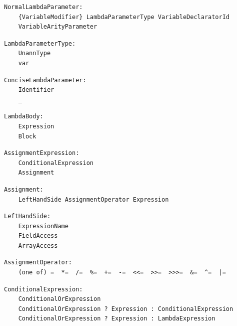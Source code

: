 \noindent\textbf{\texttt{}}\par
\begin{lstlisting}
NormalLambdaParameter:
    {VariableModifier} LambdaParameterType VariableDeclaratorId
    VariableArityParameter
\end{lstlisting}

\noindent\textbf{\texttt{}}\par
\begin{lstlisting}
LambdaParameterType:
    UnannType
    var
\end{lstlisting}

\noindent\textbf{\texttt{}}\par
\begin{lstlisting}
ConciseLambdaParameter:
    Identifier
    _
\end{lstlisting}

\noindent\textbf{\texttt{}}\par
\begin{lstlisting}
LambdaBody:
    Expression
    Block
\end{lstlisting}

\noindent\textbf{\texttt{}}\par
\begin{lstlisting}
AssignmentExpression:
    ConditionalExpression
    Assignment
\end{lstlisting}

\noindent\textbf{\texttt{}}\par
\begin{lstlisting}
Assignment:
    LeftHandSide AssignmentOperator Expression
\end{lstlisting}

\noindent\textbf{\texttt{}}\par
\begin{lstlisting}
LeftHandSide:
    ExpressionName
    FieldAccess
    ArrayAccess
\end{lstlisting}

\noindent\textbf{\texttt{}}\par
\begin{lstlisting}
AssignmentOperator:
    (one of) =  *=  /=  %=  +=  -=  <<=  >>=  >>>=  &=  ^=  |=
\end{lstlisting}

\noindent\textbf{\texttt{}}\par
\begin{lstlisting}
ConditionalExpression:
    ConditionalOrExpression
    ConditionalOrExpression ? Expression : ConditionalExpression
    ConditionalOrExpression ? Expression : LambdaExpression
\end{lstlisting}

